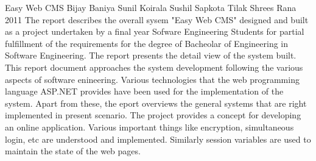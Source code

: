  \begin{conf-abstract}[]
{Easy Web CMS}
{
Bijay Baniya
Sunil Koirala
Sushil Sapkota
Tilak Shrees Rana
}
{2011}
	The report describes the overall sysem "Easy Web CMS" designed and built as a project undertaken
by a final year Sofware Engineering Students for partial fulfillment of the requirements for the degree
of Bacheolar of Engineering in Software Engineering.
	The report presents the detail view of the system built. This report document approaches the system
development following the various aspects of software enineering. Various technologies that the web programming
language ASP.NET provides have been used for the implementation of the system.
	Apart from these, the eport overviews the general systems that are right implemented in present
scenario. The project provides a concept for developing an online application. Various important things
like encryption, simultaneous login, etc are understood and implemented. Similarly session variables
are used to maintain the state of the web pages.
  \end{conf-abstract}